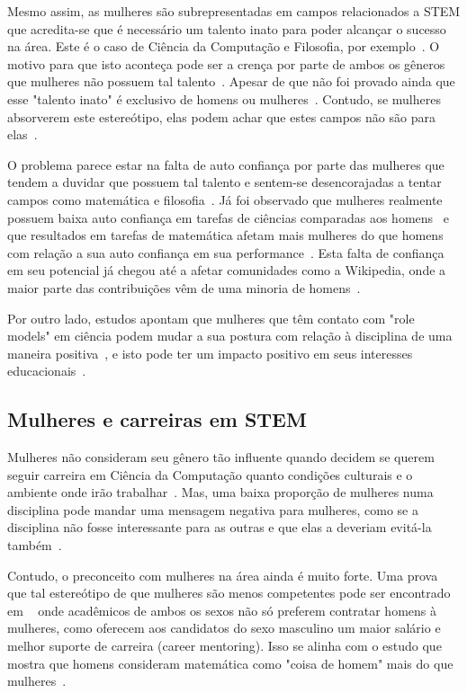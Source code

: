 Mesmo assim, as mulheres são subrepresentadas em campos relacionados a STEM que acredita-se que é necessário um talento inato para poder alcançar o sucesso na área. Este é o caso de Ciência da Computação e Filosofia, por exemplo~\cite{leslie2015expectations}. O motivo para que isto aconteça pode ser a crença por parte de ambos os gêneros que mulheres não possuem tal talento~\cite{tiedemann2000gender, kirkcaldy2007parental}. Apesar de que não foi provado ainda que esse "talento inato" é exclusivo de homens ou mulheres~\cite{hyde2005gender}. Contudo, se mulheres absorverem este estereótipo, elas podem achar que estes campos não são para elas~\cite{wigfield2000expectancy,shapiro2011major}.

O problema parece estar na falta de auto confiança por parte das mulheres que tendem a duvidar que possuem tal talento e sentem-se desencorajadas a tentar campos como matemática e filosofia~\cite{leslie2015expectations}. Já foi observado que mulheres realmente possuem baixa auto confiança em tarefas de ciências comparadas aos homens~\cite{fox1992confidence} e que resultados em tarefas de matemática afetam mais mulheres do que homens com relação a sua auto confiança em sua performance~\cite{campbell1986effects}. Esta falta de confiança em seu potencial já chegou até a afetar comunidades como a Wikipedia, onde a maior parte das contribuições vêm de uma minoria de homens~\cite{antin2011gender,lam2011wp}.

Por outro lado, estudos apontam que mulheres que têm contato com "role models" em ciência podem mudar a sua postura com relação à disciplina de uma maneira positiva~\cite{smith1986effect}, e isto pode ter um impacto positivo em seus interesses educacionais~\cite{nixon1999educational}.

\subsection{Mulheres e carreiras em STEM}

Mulheres não consideram seu gênero tão influente quando decidem se querem seguir carreira em Ciência da Computação quanto condições culturais e o ambiente onde irão trabalhar~\cite{blum2007cultural}. Mas, uma baixa proporção de mulheres numa disciplina pode mandar uma mensagem negativa para mulheres, como se a disciplina não fosse interessante para as outras e que elas a deveriam evitá-la também~\cite{shapiro2011major}.

Contudo, o preconceito com mulheres na área ainda é muito forte. Uma prova que tal estereótipo de que mulheres são menos competentes pode ser encontrado em ~\cite{moss2012science} onde acadêmicos de ambos os sexos não só preferem contratar homens à mulheres, como oferecem aos candidatos do sexo masculino um maior salário e melhor suporte de carreira (career mentoring). Isso se alinha com o estudo que mostra que homens consideram matemática como "coisa de homem" mais do que mulheres~\cite{hyde1990gender}.

